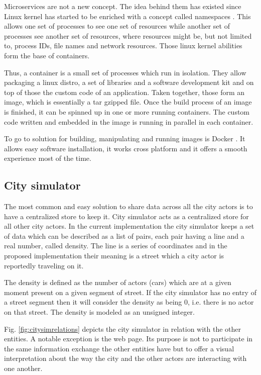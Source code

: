 \documentclass[conference]{IEEEtran}
\begin{document}
Microservices are not a new concept. The idea behind them has existed since Linux kernel has started to be enriched with a concept called namespaces \cite{wiki:linuxns}. This allows one set of processes to see one set of resources while another set of processes see another set of resources, where resources might be, but not limited to, process IDs, file names and network resources. Those linux kernel abilities form the base of containers.

Thus, a container is a small set of processes which run in isolation. They allow packaging a linux distro, a set of libraries and a software development kit and on top of those the custom code of an application. Taken together, those form an image, which is essentially a tar gzipped file. Once the build process of an image is finished, it can be spinned up in one or more running containers. The custom code written and embedded in the image is running in parallel in each container.

To go to solution for building, manipulating and running images is Docker \cite{docker}. It allows easy software installation, it works cross platform and it offers a smooth experience most of the time.

\subsection{City simulator}
\label{subsection:citysimulator}

The most common and easy solution to share data across all the city actors is to have a centralized store to keep it. City simulator acts as a centralized store for all other city actors. In the current implementation the city simulator keeps a set of data which can be described as a list of pairs, each pair having a line and a real number, called density. The line is a series of coordinates and in the proposed implementation their meaning is a street which a city actor is reportedly traveling on it.

The density is defined as the number of actors (cars) which are at a given moment present on a given segment of street. If the city simulator has no entry of a street segment then it will consider the density as being 0, i.e. there is no actor on that street. The density is modeled as an unsigned integer.

Fig. \ref{fig:citysimrelations} depicts the city simulator in relation with the other entities. A notable exception is the web page. Its purpose is not to participate in the same information exchange the other entities have but to offer a visual interpretation about the way the city and the other actors are interacting with one another.
\end{document}
